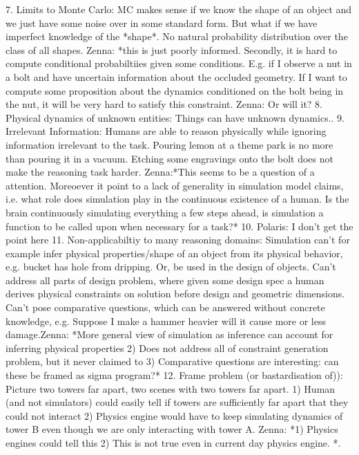 \documentclass{tlp}
\begin{document}
7. Limits to Monte Carlo: MC makes sense if we know the shape of an object and we just have some noise over in some standard form.  But what if we have imperfect knowledge of the *shape*. No natural probability distribution over the class of all shapes. Zenna: *this is just poorly informed. Secondly, it is hard to compute conditional probabiltiies given some conditions.  E.g. if I observe a nut in a bolt and have uncertain information about the occluded geometry.  If I want to compute some proposition about the dynamics conditioned on the bolt being in the nut, it will be very hard to satisfy this constraint. Zenna: Or will it?
8. Physical dynamics of unknown entities: Things can have unknown dynamics..
9. Irrelevant Information: Humans are able to reason physically while ignoring information irrelevant to the task.  Pouring lemon at a theme park is no more than pouring it in a vacuum.  Etching some engravings onto the bolt does not make the reasoning task harder. Zenna:*This seems to be a question of a attention.  Moreoever it point to a lack of generality in simulation model claims, i.e. what role does simulation play in the continuous existence of a human.  Is the brain continuously simulating everything a few steps ahead, is simulation a function to be called upon when necessary for a task?*
10. Polaris: I don't get the point here
11. Non-applicabiltiy to many reasoning domains: Simulation can't for example infer physical properties/shape of an object from its physical behavior, e.g. bucket has hole from dripping. Or, be used in the design of objects. Can't address all parts of design problem, where given some design spec a human derives physical constraints on solution before design and geometric dimensions. Can't pose comparative questions, which can be answered without concrete knowledge, e.g. Suppose I make a hammer heavier will it cause more or less damage.Zenna: *More general view of simulation as inference can account for inferring physical properties 2) Does not address all of constraint generation problem, but it never claimed to 3) Comparative questions are interesting: can these be framed as sigma program?*
12. Frame problem (or bastardisation of)): Picture two towers far apart, two scenes with two towers far apart.  1) Human (and not simulators) could easily tell if towers are sufficiently far apart that they could not interact 2) Physics engine would have to keep simulating dynamics of tower B even though we are only interacting with tower A.  Zenna: *1) Physics engines could tell this 2) This is not true even in current day physics engine.  *.
\end{document}
